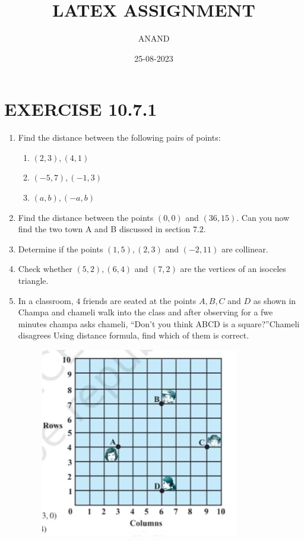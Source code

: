 \documentclass{article}
\theoremstyle{remark}
\begin{document}
\title{LATEX ASSIGNMENT}
\author{ANAND}
\date{25-08-2023}
\maketitle
\section*{EXERCISE 10.7.1}
\begin{enumerate}
\item Find the distance between the following pairs of points:
\begin{enumerate}[label=(\roman*)]
\item $(2,3), (4,1)$
\item $(-5,7), (-1,3)$
\item $(a,b), (-a,b)$
\end{enumerate}
\item Find the distance between the points $(0,0)$ and $(36,15)$. Can you now find the two town A and B discussed in section $7.2$.
\item Determine if the points $(1,5), (2,3)$ and $(-2,11)$ are collinear.
\item Check whether $(5,2), (6,4)$ and $(7,2)$ are the vertices of an isoceles triangle.
\item In a classroom, $4$ friends are seated at the points $A, B, C$ and $D$ as shown  in  Champa and chameli walk into the class and  after observing for a fwe minutes champa asks chameli, \textquotedblleft Don't you think ABCD is a square?\textquotedblright  Chameli disagrees Using distance formula, find which of them is correct.
	\begin{figure}[ht]
\centering
\includegraphics[width=\columnwidth]{figs/7.8.png}

\end{figure}
\end{enumerate}
\end{document}

